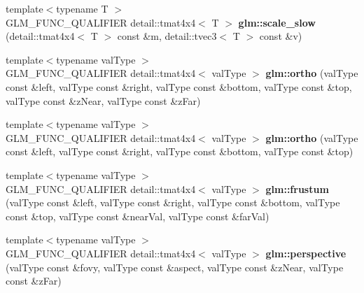 \begin{DoxyCompactItemize}
\item 
\hypertarget{namespaceglm_a76d77fa87fa61d2f5fe7d103d13fb8da}{}{\footnotesize template$<$typename T $>$ }\\G\+L\+M\+\_\+\+F\+U\+N\+C\+\_\+\+Q\+U\+A\+L\+I\+F\+I\+E\+R detail\+::tmat4x4$<$ T $>$ {\bfseries glm\+::scale\+\_\+slow} (detail\+::tmat4x4$<$ T $>$ const \&m, detail\+::tvec3$<$ T $>$ const \&v)\label{namespaceglm_a76d77fa87fa61d2f5fe7d103d13fb8da}

\item 
\hypertarget{namespaceglm_acc52ed471fb6f5c9ba9c548c0f2e818e}{}{\footnotesize template$<$typename val\+Type $>$ }\\G\+L\+M\+\_\+\+F\+U\+N\+C\+\_\+\+Q\+U\+A\+L\+I\+F\+I\+E\+R detail\+::tmat4x4$<$ val\+Type $>$ {\bfseries glm\+::ortho} (val\+Type const \&left, val\+Type const \&right, val\+Type const \&bottom, val\+Type const \&top, val\+Type const \&z\+Near, val\+Type const \&z\+Far)\label{namespaceglm_acc52ed471fb6f5c9ba9c548c0f2e818e}

\item 
\hypertarget{namespaceglm_a3add8e024acb8ca1151c68e03bbb0c1c}{}{\footnotesize template$<$typename val\+Type $>$ }\\G\+L\+M\+\_\+\+F\+U\+N\+C\+\_\+\+Q\+U\+A\+L\+I\+F\+I\+E\+R detail\+::tmat4x4$<$ val\+Type $>$ {\bfseries glm\+::ortho} (val\+Type const \&left, val\+Type const \&right, val\+Type const \&bottom, val\+Type const \&top)\label{namespaceglm_a3add8e024acb8ca1151c68e03bbb0c1c}

\item 
\hypertarget{namespaceglm_a8baf5656c3afcb2e3ebcc34c542610a4}{}{\footnotesize template$<$typename val\+Type $>$ }\\G\+L\+M\+\_\+\+F\+U\+N\+C\+\_\+\+Q\+U\+A\+L\+I\+F\+I\+E\+R detail\+::tmat4x4$<$ val\+Type $>$ {\bfseries glm\+::frustum} (val\+Type const \&left, val\+Type const \&right, val\+Type const \&bottom, val\+Type const \&top, val\+Type const \&near\+Val, val\+Type const \&far\+Val)\label{namespaceglm_a8baf5656c3afcb2e3ebcc34c542610a4}

\item 
\hypertarget{namespaceglm_ab1ca9ec6ed391988cbf68b450ff8db8e}{}{\footnotesize template$<$typename val\+Type $>$ }\\G\+L\+M\+\_\+\+F\+U\+N\+C\+\_\+\+Q\+U\+A\+L\+I\+F\+I\+E\+R detail\+::tmat4x4$<$ val\+Type $>$ {\bfseries glm\+::perspective} (val\+Type const \&fovy, val\+Type const \&aspect, val\+Type const \&z\+Near, val\+Type const \&z\+Far)\label{namespaceglm_ab1ca9ec6ed391988cbf68b450ff8db8e}


\end{DoxyCompactItemize}
